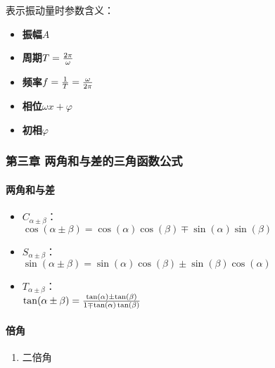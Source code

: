 \documentclass[
]{article}
\begin{document}
表示振动量时参数含义：

\begin{itemize}
\item
  \textbf{振幅}\(A\)
\item
  \textbf{周期}\(T = {2\pi \over \omega}\)
\item
  \textbf{频率}\(f = {1 \over T} = {\omega \over 2\pi}\)
\item
  \textbf{相位}\(\omega x + \varphi\)
\item
  \textbf{初相}\(\varphi\)
\end{itemize}

\hypertarget{ux7b2cux4e09ux7ae0-ux4e24ux89d2ux548cux4e0eux5deeux7684ux4e09ux89d2ux51fdux6570ux516cux5f0f}{%
\subsubsection{第三章
两角和与差的三角函数公式}\label{ux7b2cux4e09ux7ae0-ux4e24ux89d2ux548cux4e0eux5deeux7684ux4e09ux89d2ux51fdux6570ux516cux5f0f}}

\hypertarget{ux4e24ux89d2ux548cux4e0eux5dee}{%
\paragraph{两角和与差}\label{ux4e24ux89d2ux548cux4e0eux5dee}}

\begin{itemize}
\item
  \(C_{\alpha \pm \beta}\)：\\
  \(\cos(\alpha \pm \beta) = \cos(\alpha)\cos(\beta) \mp \sin(\alpha)\sin(\beta)\)
\item
  \(S_{\alpha \pm \beta}\)：\\
  \(\sin(\alpha \pm \beta) = \sin(\alpha)\cos(\beta) \pm \sin(\beta)\cos(\alpha)\)
\item
  \(T_{\alpha \pm \beta}\)：\\
  \(\tan(\alpha \pm \beta) = {{\tan(\alpha) \pm \tan(\beta)} \over {1 \mp \tan(\alpha)\tan(\beta)}}\)
\end{itemize}

\hypertarget{ux500dux89d2}{%
\paragraph{倍角}\label{ux500dux89d2}}

\begin{enumerate}
\def\labelenumi{\arabic{enumi}.}
\item
  二倍角
\end{enumerate}
\end{document}
